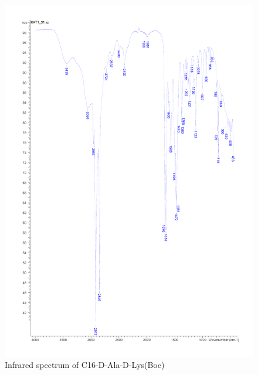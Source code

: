\begin{figure}[ht!]
\centering
\includegraphics[scale=0.6]{IR/KAT1_34.pdf}
\caption{Infrared spectrum of C16-D-Ala-D-Lys(Boc)}
\end{figure}

